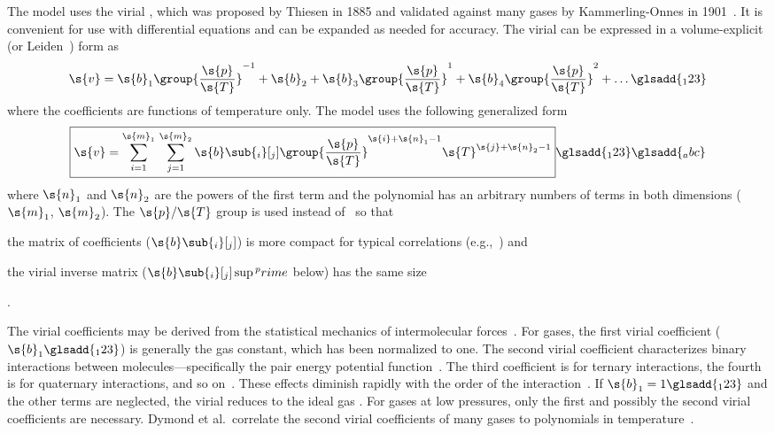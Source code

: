 The model uses the virial , which was proposed by Thiesen in 1885 and validated against many gases by Kammerling-Onnes in 1901~\cite{Morrison1985, Nag2008}. %
It is convenient for use with differential equations and can be expanded as needed for accuracy.  The virial  can be expressed in a volume-explicit (or Leiden~\cite{McGlashan1973}) form as
\begin{equation}
  \label{eq:VirialLeiden1}%
  \s{v} = \s{b}_1\group{\frac{\s{p}}{\s{T}}}^{-1} + \s{b}_2 + \s{b}_3\group{\frac{\s{p}}{\s{T}}}^{1} + \s{b}_4\group{\frac{\s{p}}{\s{T}}}^{2} + \ldots
  \glsadd{_123}
\end{equation}
where the coefficients are functions of temperature only\cite{Dymond2002}. %
The model uses the following generalized form
\begin{equation}
  \label{eq:VirialLeiden}
  \boxed{\s{v} = \sum_{i = 1}^{\s{m}_1}\,\sum_{j = 1}^{\s{m}_2}\s{b}\sub{_i}[_j]\group{\frac{\s{p}}{\s{T}}}^{\s{i} + \s{n}_1 - 1}\s{T}^{\s{j} + \s{n}_2 - 1}}
  \glsadd{_123}
  \glsadd{_abc}
\end{equation}
where $\s{n}_1$ and $\s{n}_2$ are the powers of the first term and the polynomial has an arbitrary numbers of terms in both dimensions ($\s{m}_1$, $\s{m}_2$).  The $\s{p}/\s{T}$ group is used instead of~ so that \begin{inparaenum}[(1)]\item the matrix of coefficients ($\s{b}\sub{_i}[_j]$) is more compact for typical correlations (e.g.,~\cite{Dymond2002}) and \item the virial inverse matrix ($\s{b}\sub{_i}[_j]\sup{^prime}$ below) has the same size\end{inparaenum}.

The virial coefficients may be derived from the statistical mechanics of intermolecular forces~\cite{Salzman2004}.  For gases, the first virial coefficient ($\s{b}_1\glsadd{_123}$) is generally the gas constant, which has been normalized to one.  The second virial coefficient characterizes binary interactions between molecules---specifically the pair energy potential function~\cite{Dymond2002}.  The third coefficient is for ternary interactions, the fourth is for quaternary interactions, and so on~\cite{McGlashan1973}.  These effects diminish rapidly with the order of the interaction~\cite{Present1958}.  If $\s{b}_1 = 1\glsadd{_123}$ and the other terms are neglected, the virial  reduces to the ideal gas .  For gases at low pressures, only the first and possibly the second virial coefficients are necessary.  Dymond et al.\ correlate the second virial coefficients of many gases to polynomials in temperature~\cite{Dymond2002}.

